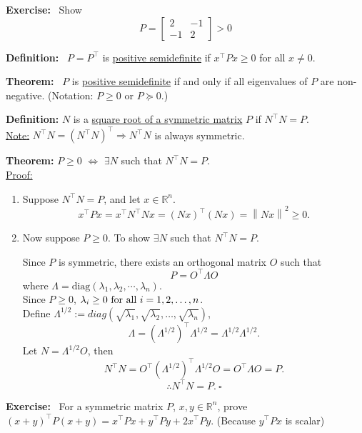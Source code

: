 \documentclass[letterpaper]{article}
\newcommand{\real}{\mathbb R}  %
\begin{document}
\noindent	\textbf{Exercise:}~ Show
	$$ P = \left[  \begin{array}{cc} 	 2 & -1 \\ 	 -1 & 2 	\end{array}	 \right] > 0		$$

\noindent \textbf{Definition:}~ $P=P^\top$ is \underline{positive semidefinite} if $x^\top P x \geq 0$ for all $x \neq 0$.

\noindent \textbf{Theorem:}~ $P$ is \underline{positive semidefinite} if and only if all eigenvalues of $P$ are non-negative. (Notation: $P \geq 0$	or $P \succcurlyeq 0$.)

\noindent \textbf{Definition:} $N$ is a \underline{square root of a symmetric matrix} $P$ if $N^\top N = P$.\\
    \underline{Note:} $N^\top N = \left(N^\top N\right)^\top \Rightarrow N^\top N$ is always symmetric.

\noindent \textbf{Theorem:} $P\geq 0$ $ \Leftrightarrow$ $ \exists N$ such that $N^\top N = P$.\\
\underline{Proof:}	
    \begin{enumerate}
        \item Suppose $N^\top N = P$, and let $x\in\real^n$.\\
            $$  x^\top P x = x^\top N^\top N x = (N x)^\top (N x) = \left\| N x \right\| ^2 \geq 0.$$
		\item Now suppose $P\geq 0$. To show $\exists N$ such that $N^\top N = P$.

		Since $P$ is symmetric, there exists an orthogonal matrix $O$ such that
		$$ P = O^\top \Lambda O $$
		where $\Lambda = \mbox{diag}\left(\lambda _1,\lambda_2, \dotsb, \lambda_n\right)$. \\
        Since $P \geq 0$, $\lambda_i \geq 0\textnormal{ for all }i=1,2,\dots,n$.\\
        Define $\Lambda ^{1/2} := diag(\sqrt{\lambda_1}, \sqrt{\lambda_2}, \dots, \sqrt{\lambda_n})$,
		$$ \Lambda = (\Lambda^{1/2})^\top \Lambda^{1/2} =\Lambda^{1/2} \Lambda^{1/2}.$$
        Let $N = \Lambda ^ {1/2} O $, then
		$$ N ^\top N = O^\top \left(\Lambda^{1/2}\right)^\top \Lambda^{1/2} O = O^\top \Lambda O = P.$$
		$$ \therefore N^\top N = P.\ \square$$
    \end{enumerate}
		
\noindent	\textbf{Exercise:}~ For a symmetric matrix $P$, $x,y \in \mathbb{R}^n$, prove $(x+y)^\top P (x+y) = x^\top Px+y^\top Py + 2x^\top Py$. (Because $y^\top Px$ is scalar)
\end{document}
